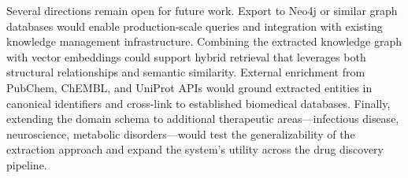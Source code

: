 Several directions remain open for future work. Export to Neo4j or similar graph databases would enable production-scale queries and integration with existing knowledge management infrastructure. Combining the extracted knowledge graph with vector embeddings could support hybrid retrieval that leverages both structural relationships and semantic similarity. External enrichment from PubChem, ChEMBL, and UniProt APIs would ground extracted entities in canonical identifiers and cross-link to established biomedical databases. Finally, extending the domain schema to additional therapeutic areas---infectious disease, neuroscience, metabolic disorders---would test the generalizability of the extraction approach and expand the system's utility across the drug discovery pipeline.
